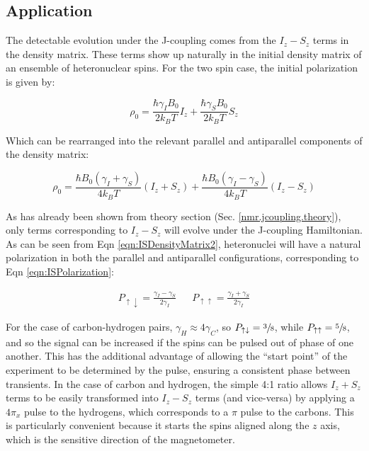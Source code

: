 \documentclass[PaulGanssle-Thesis.tex]{subfiles}
\begin{document}
\subsection{Application}
\label{nmr.jcoupling.application}
The detectable evolution under the J-coupling comes from the $I_{z}-S_{z}$ terms in the density matrix. These terms show up naturally in the initial density matrix of an ensemble of heteronuclear spins. For the two spin case, the initial polarization is given by:

\begin{equation}
\rho_{0}  =  \frac{\hbar\gamma_{I}B_0}{2k_{B}T}I_{z} + \frac{\hbar\gamma_{S}B_{0}}{2k_{B}T}S_{z}
\label{eqn:ISDensityMatrix}
\end{equation} 

Which can be rearranged into the relevant parallel and antiparallel components of the density matrix:
 
\begin{equation}
\rho_{0} = \frac{\hbar B_{0}\left(\gamma_{I} + \gamma_{S}\right)}{4k_{B}T}\left(I_{z} + S_{z}\right) + \frac{\hbar B_{0}\left(\gamma_{I}-\gamma_{S}\right)}{4k_{B}T}\left(I_{z} - S_{z}\right)
\label{eqn:ISDensityMatrix2}
\end{equation}

As has already been shown from theory section (Sec. \ref{nmr.jcoupling.theory}), only terms corresponding to $I_{z} - S_{z}$ will evolve under the J-coupling Hamiltonian. As can be seen from Eqn \ref{eqn:ISDensityMatrix2}, heteronuclei will have a natural polarization in both the parallel and antiparallel configurations, corresponding to Eqn \ref{eqn:ISPolarization}:

\begin{align}
\label{eqn:ISPolarization}
P_{\uparrow\downarrow} = \frac{\gamma_{I} - \gamma_{S}}{2\gamma_{I}} & & P_{\uparrow\uparrow} = \frac{\gamma_{I} + \gamma_{S}}{2\gamma_{I}}
\end{align}

For the case of carbon-hydrogen pairs, $\gamma_H \approx 4\gamma_C$, so $P_{\uparrow\downarrow} = \sfrac{3}{8}$, while $P_{\uparrow\uparrow} = \sfrac{5}{8}$, and so the signal can be increased if the spins can be pulsed out of phase of one another. This has the additional advantage of allowing the ``start point'' of the experiment to be determined by the pulse, ensuring a consistent phase between transients. In the case of carbon and hydrogen, the simple 4:1 ratio allows $I_{z} + S_{z}$ terms to be easily transformed into $I_{z} - S_{z}$ terms (and vice-versa) by applying a $4\pi_{x}$ pulse to the hydrogens, which corresponds to a $\pi$ pulse to the carbons. This is particularly convenient because it starts the spins aligned along the $z$ axis, which is the sensitive direction of the magnetometer. 
\end{document}
